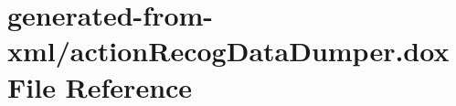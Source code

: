 \hypertarget{actionRecogDataDumper_8dox}{}\section{generated-\/from-\/xml/action\+Recog\+Data\+Dumper.dox File Reference}
\label{actionRecogDataDumper_8dox}
